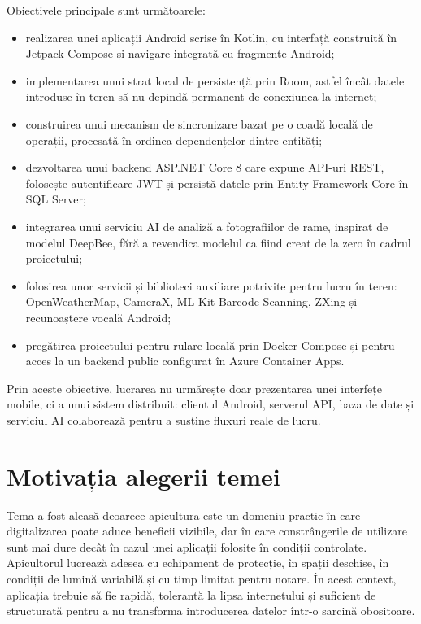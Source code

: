 Obiectivele principale sunt următoarele:
\begin{itemize}
	\item realizarea unei aplicații Android scrise în Kotlin, cu interfață construită în Jetpack Compose și navigare integrată cu fragmente Android;
	\item implementarea unui strat local de persistență prin Room, astfel încât datele introduse în teren să nu depindă permanent de conexiunea la internet;
	\item construirea unui mecanism de sincronizare bazat pe o coadă locală de operații, procesată în ordinea dependențelor dintre entități;
	\item dezvoltarea unui backend ASP.NET Core 8 care expune API-uri REST, folosește autentificare JWT și persistă datele prin Entity Framework Core în SQL Server;
	\item integrarea unui serviciu AI de analiză a fotografiilor de rame, inspirat de modelul DeepBee, fără a revendica modelul ca fiind creat de la zero în cadrul proiectului;
	\item folosirea unor servicii și biblioteci auxiliare potrivite pentru lucru în teren: OpenWeatherMap, CameraX, ML Kit Barcode Scanning, ZXing și recunoaștere vocală Android;
	\item pregătirea proiectului pentru rulare locală prin Docker Compose și pentru acces la un backend public configurat în Azure Container Apps.
\end{itemize}

Prin aceste obiective, lucrarea nu urmărește doar prezentarea unei interfețe mobile, ci a unui sistem distribuit: clientul Android, serverul API, baza de date și serviciul AI colaborează pentru a susține fluxuri reale de lucru.

\section{Motivația alegerii temei}

Tema a fost aleasă deoarece apicultura este un domeniu practic în care digitalizarea poate aduce beneficii vizibile, dar în care constrângerile de utilizare sunt mai dure decât în cazul unei aplicații folosite în condiții controlate. Apicultorul lucrează adesea cu echipament de protecție, în spații deschise, în condiții de lumină variabilă și cu timp limitat pentru notare. În acest context, aplicația trebuie să fie rapidă, tolerantă la lipsa internetului și suficient de structurată pentru a nu transforma introducerea datelor într-o sarcină obositoare.

